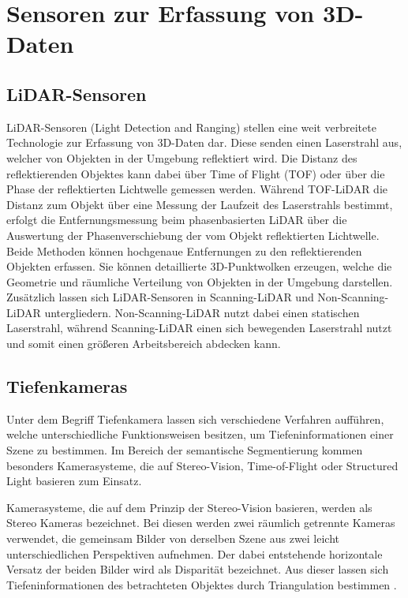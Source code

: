 \chapter{Sensoren zur Erfassung von 3D-Daten}

\section{LiDAR-Sensoren}
LiDAR-Sensoren (Light Detection and Ranging) stellen eine weit verbreitete
Technologie zur Erfassung von 3D-Daten dar. Diese senden einen Laserstrahl aus,
welcher von Objekten in der Umgebung reflektiert wird. Die Distanz des
reflektierenden Objektes kann dabei über Time of Flight (TOF) oder über die
Phase der reflektierten Lichtwelle gemessen werden. Während TOF-LiDAR die
Distanz zum Objekt über eine Messung der Laufzeit des Laserstrahls bestimmt,
erfolgt die Entfernungsmessung beim phasenbasierten LiDAR über die Auswertung
der Phasenverschiebung der vom Objekt reflektierten Lichtwelle. Beide Methoden
können hochgenaue Entfernungen zu den reflektierenden Objekten erfassen. Sie
können detaillierte 3D-Punktwolken erzeugen, welche die Geometrie und räumliche
Verteilung von Objekten in der Umgebung darstellen. Zusätzlich lassen sich
LiDAR-Sensoren in Scanning-LiDAR und Non-Scanning-LiDAR untergliedern.
Non-Scanning-LiDAR nutzt dabei einen statischen Laserstrahl, während
Scanning-LiDAR einen sich bewegenden Laserstrahl nutzt und somit einen größeren
Arbeitsbereich abdecken kann. \cite{8529992}

\section{Tiefenkameras}
Unter dem Begriff Tiefenkamera lassen sich verschiedene Verfahren aufführen,
welche unterschiedliche Funktionsweisen besitzen, um Tiefeninformationen einer
Szene zu bestimmen. Im Bereich der semantische Segmentierung kommen besonders
Kamerasysteme, die auf Stereo-Vision, Time-of-Flight oder Structured Light
basieren zum Einsatz.

Kamerasysteme, die auf dem Prinzip der Stereo-Vision basieren, werden als
Stereo Kameras bezeichnet. Bei diesen werden zwei räumlich getrennte Kameras
verwendet, die gemeinsam Bilder von derselben Szene aus zwei leicht
unterschiedlichen Perspektiven aufnehmen. Der dabei entstehende horizontale
Versatz der beiden Bilder wird als Disparität bezeichnet. Aus dieser lassen
sich Tiefeninformationen des betrachteten Objektes durch Triangulation
bestimmen \cite{8932817}.

